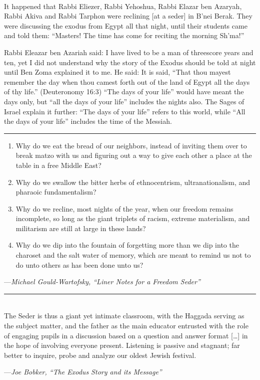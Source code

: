 \documentclass[letter,11pt,openany]{memoir}
\newcommand{\HgSource}[1]{\hfill{\small---\itshape{#1}}}
\newcommand{\HgFill}{\vfill \hrule \vfill}
\newenvironment{HgEnglish}{\strut\\\noindent}{\vspace{1em}}
\newcommand{\LSrc}{\textsuperscript{\upshape{[L]}}}
\begin{document}
\begin{HgEnglish}
It happened that Rabbi Eliezer, Rabbi Yehoshua, Rabbi Elazar ben Azaryah, Rabbi
Akiva and Rabbi Tarphon were reclining [at a seder] in B'nei Berak. They were
discussing the exodus from Egypt all that night, until their students came and
told them: ``Masters! The time has come for reciting the morning Sh'ma!''

Rabbi Eleazar ben Azariah said: I have lived to be a man of threescore years and
ten, yet I did not understand why the story of the Exodus should be told at
night until Ben Zoma explained it to me. He said: It is said, ``That thou mayest
remember the day when thou camest forth out of the land of Egypt all the days of
thy life.'' (Deuteronomy 16:3) ``The days of your life'' would have meant the
days only, but ``all the days of your life'' includes the nights also.  The
Sages of Israel explain it further: ``The days of your life'' refers to this
world, while ``All the days of your life'' includes the time of the Messiah.
\LSrc
\end{HgEnglish}

\HgFill

\begin{enumerate}
  \item
    Why do we eat the bread of our neighbors, instead of inviting them over to
    break matzo with us and figuring out a way to give each other a place at the
    table in a free Middle East?

  \item
    Why do we swallow the bitter herbs of ethnocentrism, ultranationalism, and
    pharaoic fundamentalism? 

  \item
    Why do we recline, most nights of the year, when our freedom remains
    incomplete, so long as the giant triplets of racism, extreme materialism,
    and militarism are still at large in these lands?

  \item
    Why do we dip into the fountain of forgetting more than we dip into the
    \linebreak
    charoset and the salt water of memory, which are meant to remind us not to
    do unto others as has been done unto us?
\end{enumerate}
\HgSource{Michael Gould-Wartofsky, ``Liner Notes for a Freedom Seder''}\\

\HgFill

\begin{HgEnglish}
  The Seder is thus a giant yet intimate classroom, with the Haggada serving as
  the subject matter, and the father as the main educator entrusted with the
  role of engaging pupils in a discussion based on a question and answer format
  [\ldots] in the hope of involving everyone present. Listening is passive and
  stagnant; far better to inquire, probe and analyze our oldest Jewish festival.

  \HgSource{Joe Bobker, ``The Exodus Story and its Message''}
\end{HgEnglish}
\end{document}
